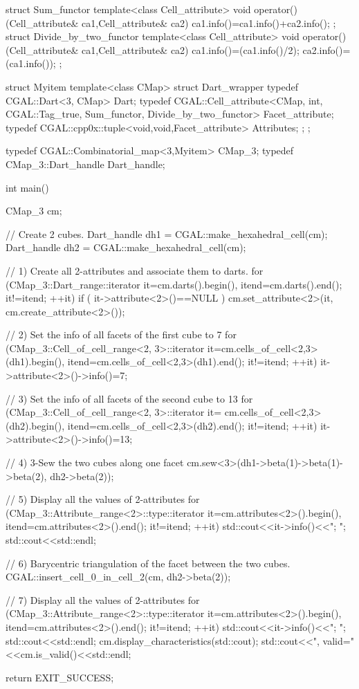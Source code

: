 \begin{ccExampleCode}
struct Sum_functor
{
  template<class Cell_attribute>
  void operator()(Cell_attribute& ca1,Cell_attribute& ca2)
  { ca1.info()=ca1.info()+ca2.info(); }
};
struct Divide_by_two_functor
{
  template<class Cell_attribute>
  void operator()(Cell_attribute& ca1,Cell_attribute& ca2)
  {
    ca1.info()=(ca1.info()/2);
    ca2.info()=(ca1.info());
  }
};

struct Myitem
{
  template<class CMap>
  struct Dart_wrapper
  {
    typedef CGAL::Dart<3, CMap> Dart;
    typedef CGAL::Cell_attribute<CMap, int, CGAL::Tag_true,
				 Sum_functor, Divide_by_two_functor>
                         Facet_attribute;
    typedef CGAL::cpp0x::tuple<void,void,Facet_attribute> Attributes;
  };
};

typedef CGAL::Combinatorial_map<3,Myitem> CMap_3;
typedef CMap_3::Dart_handle               Dart_handle;

int main()
{
  CMap_3 cm;
  
  // Create 2 cubes.
  Dart_handle dh1 = CGAL::make_hexahedral_cell(cm);
  Dart_handle dh2 = CGAL::make_hexahedral_cell(cm);

  // 1) Create all 2-attributes and associate them to darts.
  for (CMap_3::Dart_range::iterator 
	 it=cm.darts().begin(), itend=cm.darts().end();
	 it!=itend; ++it)
    {
      if ( it->attribute<2>()==NULL )
	cm.set_attribute<2>(it, cm.create_attribute<2>());
    }
  
  // 2) Set the info of all facets of the first cube to 7
  for (CMap_3::Cell_of_cell_range<2, 3>::iterator 
	 it=cm.cells_of_cell<2,3>(dh1).begin(), 
	 itend=cm.cells_of_cell<2,3>(dh1).end(); it!=itend; ++it)
    { it->attribute<2>()->info()=7; }
  
  // 3) Set the info of all facets of the second cube to 13
  for (CMap_3::Cell_of_cell_range<2, 3>::iterator it=
	 cm.cells_of_cell<2,3>(dh2).begin(),
	 itend=cm.cells_of_cell<2,3>(dh2).end(); it!=itend; ++it)
    { it->attribute<2>()->info()=13; }
  
  // 4) 3-Sew the two cubes along one facet
  cm.sew<3>(dh1->beta(1)->beta(1)->beta(2), dh2->beta(2));

  // 5) Display all the values of 2-attributes
  for (CMap_3::Attribute_range<2>::type::iterator 
	 it=cm.attributes<2>().begin(), itend=cm.attributes<2>().end(); 
       it!=itend; ++it)
    {
      std::cout<<it->info()<<"; ";
    }
  std::cout<<std::endl;

  // 6) Barycentric triangulation of the facet between the two cubes.
  CGAL::insert_cell_0_in_cell_2(cm, dh2->beta(2));

  // 7) Display all the values of 2-attributes
  for (CMap_3::Attribute_range<2>::type::iterator 
	 it=cm.attributes<2>().begin(), itend=cm.attributes<2>().end(); 
       it!=itend; ++it)
    {
      std::cout<<it->info()<<"; ";
    }
  std::cout<<std::endl;
  cm.display_characteristics(std::cout);
  std::cout<<", valid="<<cm.is_valid()<<std::endl;

  return EXIT_SUCCESS;
}
\end{ccExampleCode}

